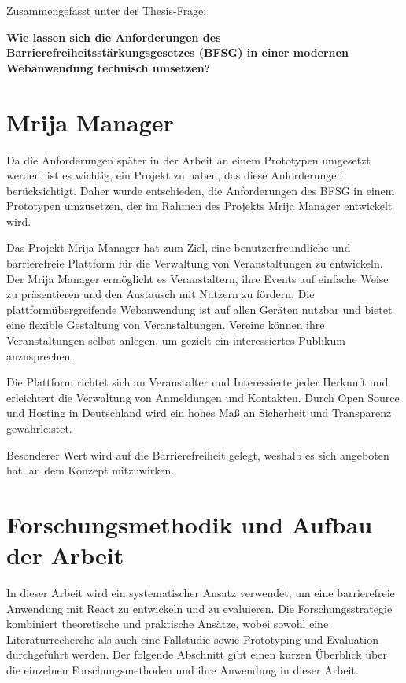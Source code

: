 \vspace{1em}
\noindent
Zusammengefasst unter der Thesis-Frage:
\vspace{1em}

\begin{tcolorbox}[boxrule=0pt,sharp corners,enhanced,borderline west={2pt}{0pt}{blue}]
    \textbf{\large Wie lassen sich die Anforderungen des Barrierefreiheitsstärkungsgesetzes (BFSG) in einer modernen Webanwendung technisch umsetzen?}
\end{tcolorbox}

\vspace{1em}

\section{Mrija Manager}
Da die Anforderungen später in der Arbeit an einem Prototypen umgesetzt werden, ist es wichtig, ein Projekt zu haben, das diese Anforderungen berücksichtigt. Daher wurde entschieden, die Anforderungen des BFSG in einem Prototypen umzusetzen, der im Rahmen des Projekts Mrija Manager entwickelt wird.

Das Projekt Mrija Manager hat zum Ziel, eine benutzerfreundliche und barrierefreie Plattform für die Verwaltung von Veranstaltungen zu entwickeln. Der Mrija Manager ermöglicht es Veranstaltern, ihre Events auf einfache Weise zu präsentieren und den Austausch mit Nutzern zu fördern. Die plattformübergreifende Webanwendung ist auf allen Geräten nutzbar und bietet eine flexible Gestaltung von Veranstaltungen. Vereine können ihre Veranstaltungen selbst anlegen, um gezielt ein interessiertes Publikum anzusprechen.

Die Plattform richtet sich an Veranstalter und Interessierte jeder Herkunft und erleichtert die Verwaltung von Anmeldungen und Kontakten. Durch Open Source und Hosting in Deutschland wird ein hohes Maß an Sicherheit und Transparenz gewährleistet.

Besonderer Wert wird auf die Barrierefreiheit gelegt, weshalb es sich angeboten hat, an dem Konzept mitzuwirken.
\section{Forschungsmethodik und Aufbau der Arbeit}

In dieser Arbeit wird ein systematischer Ansatz verwendet, um eine barrierefreie Anwendung mit React zu entwickeln und zu evaluieren. Die Forschungsstrategie kombiniert theoretische und praktische Ansätze, wobei sowohl eine Literaturrecherche als auch eine Fallstudie sowie Prototyping und Evaluation durchgeführt werden. Der folgende Abschnitt gibt einen kurzen Überblick über die einzelnen Forschungsmethoden und ihre Anwendung in dieser Arbeit.

